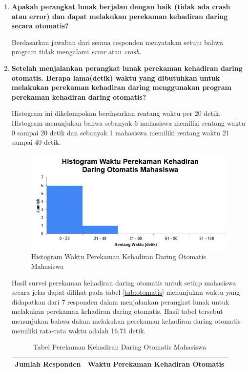\begin{enumerate}
	\item \textbf{Apakah perangkat lunak berjalan dengan baik (tidak ada crash atau error) dan dapat melakukan perekaman kehadiran daring secara otomatis?}
	
	Berdasarkan jawaban dari semua responden menyatakan setuju bahwa program tidak mengalami \textit{error} atau \textit{crash}.
	\item \textbf{Setelah menjalankan perangkat lunak perekaman kehadiran daring otomatis. Berapa lama(detik) waktu yang dibutuhkan untuk melakukan perekaman kehadiran daring menggunakan program perekaman kehadiran daring otomatis?}
	
	Histogram ini dikelompokan berdasarkan rentang waktu per 20 detik. Histogram menunjukan bahwa sebanyak 6 mahasiswa memiliki rentang waktu 0 sampai 20 detik dan sebanyak 1 mahasiswa memiliki rentang waktu 21 sampai 40 detik. 
	\begin{figure}[H] \vspace{-0.3cm}
		\centering
		\includegraphics[scale=0.75]{Gambar/HistogramDaringOtomatisMahasiswa.jpg}
		\caption{Histogram Waktu Perekaman Kehadiran Daring Otomatis Mahasiswa}
		\label{fig:olMahasiswa}
	\end{figure}
	Hasil survei perekaman kehadiran daring otomatis untuk setiap mahasiswa secara jelas dapat dilihat pada tabel \ref{tab:otomatis} menunjukan waktu yang didapatkan dari 7 responden dalam menjalankan perangkat lunak untuk melakukan perekaman kehadiran daring otomatis. Hasil tabel tersebut menunjukan bahwa dalam melakukan perekaman kehadiran daring otomatis memiliki rata-rata waktu adalah 16,71 detik.
	\begin{table}[ht]			
		\caption{Tabel Perekaman Kehadiran Daring Otomatis Mahasiswa}
		\centering
		\begin{tabular}{|p{3.5cm} |p{7cm}|}
			\hline
			Jumlah Responden &  Waktu Perekaman Kehadiran Otomatis \\ \hline     

\end{tabular}
\end{table}
\end{enumerate}
